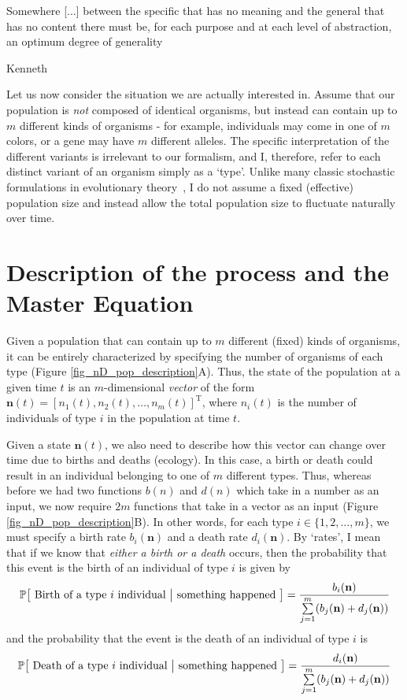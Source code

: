 \epigraph{\justifying Somewhere [...] between the specific that has no meaning and the general that has no content there must be, for each purpose and at each level of abstraction, an optimum degree of generality}{Kenneth~\citet{boulding_general_1956}}

Let us now consider the situation we are actually interested in. Assume that our population is \emph{not} composed of identical organisms, but instead can contain up to $m$ different kinds of organisms - for example, individuals may come in one of $m$ colors, or a gene may have $m$ different alleles. The specific interpretation of the different variants is irrelevant to our formalism, and I, therefore, refer to each distinct variant of an organism simply as a `type'. Unlike many classic stochastic formulations in evolutionary theory~\citep{fisher_genetical_1930,wright_evolution_1931,moran_random_1958, kimura_problems_1957, kimura_diffusion_1964, kimura_number_1964, crow_introduction_1970, lande_natural_1976}, I do not assume a fixed (effective) population size and instead allow the total population size to fluctuate naturally over time. 

\section{Description of the process and the Master Equation}
Given a population that can contain up to $m$ different (fixed) kinds of organisms, it can be entirely characterized by specifying the number of organisms of each type (Figure \ref{fig_nD_pop_description}A). Thus, the state of the population at a given time $t$ is an $m$-dimensional \emph{vector} of the form $\mathbf{n}(t) = [n_1(t),n_2(t),\ldots,n_m(t)]^{\mathrm{T}}$, where $n_i(t)$ is the number of individuals of type $i$ in the population at time $t$.

Given a state $\mathbf{n}(t)$,  we also need to describe how this vector can change over time due to births and deaths (ecology). In this case, a birth or death could result in an individual belonging to one of $m$ different types. Thus, whereas before we had two functions $b(n)$ and $d(n)$ which take in a number as an input, we now require $2m$ functions that take in a vector as an input (Figure \ref{fig_nD_pop_description}B). In other words, for each type $i \in \{1,2,\ldots,m\}$, we must specify a birth rate $b_i(\mathbf{n})$ and a death rate $d_i(\mathbf{n})$. By `rates', I mean that if we know that \emph{either a birth or a death} occurs, then the probability that this event is the birth of an individual of type $i$ is given by
\begin{equation*}
\mathbb{P}\big[\textrm{ Birth of a type $i$ individual } \big{|} \textrm{ something happened }\big] = \frac{b_i(\mathbf{n})}{\sum\limits_{j=1}^{m}(b_j(\mathbf{n})+d_j(\mathbf{n}))}
\end{equation*}
and the probability that the event is the death of an individual of type $i$ is
\begin{equation*}
\mathbb{P}\big[\textrm{ Death of a type $i$ individual } \big{|} \textrm{ something happened }\big] = \frac{d_i(\mathbf{n})}{\sum\limits_{j=1}^{m}(b_j(\mathbf{n})+d_j(\mathbf{n}))}
\end{equation*}

